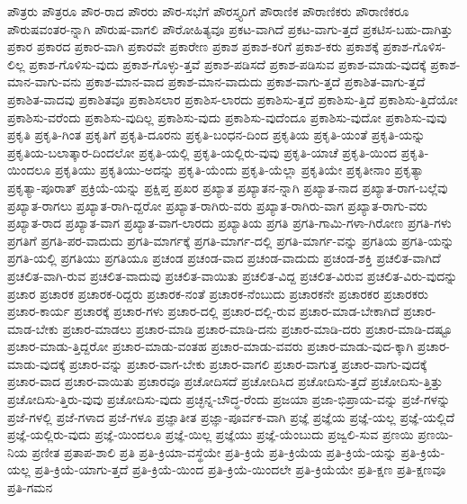 {ಪೌತ್ರರು
ಪೌತ್ರರೂ
ಪೌರ-ರಾದ
ಪೌರರು
ಪೌರ-ಸಭೆಗೆ
ಪೌರಸ್ತ್ಯರಿಗೆ
ಪೌರಾಣಿಕ
ಪೌರಾಣಿಕರು
ಪೌರಾಣಿಕರೂ
ಪೌರುಷವಂತರ-ನ್ನಾಗಿ
ಪೌರುಷ-ವಾಗಲಿ
ಪೌರೋಹಿತ್ಯವೂ
ಪ್ರಕಟ-ವಾಗಿದೆ
ಪ್ರಕಟ-ವಾಗು-ತ್ತದೆ
ಪ್ರಕಟಿಸ-ಬಹು-ದಾಗಿತ್ತು
ಪ್ರಕಾರ
ಪ್ರಕಾರದ
ಪ್ರಕಾರ-ವಾಗಿ
ಪ್ರಕಾರವೇ
ಪ್ರಕಾರೇಣ
ಪ್ರಕಾಶ
ಪ್ರಕಾಶ-ಕರಿಗೆ
ಪ್ರಕಾಶ-ಕರು
ಪ್ರಕಾಶಕ್ಕೆ
ಪ್ರಕಾಶ-ಗೊಳಿಸ-ಲಿಲ್ಲ
ಪ್ರಕಾಶ-ಗೊಳಿಸು-ವುದು
ಪ್ರಕಾಶ-ಗೊಳ್ಳು-ತ್ತವೆ
ಪ್ರಕಾಶ-ಪಡಿಸದೆ
ಪ್ರಕಾಶ-ಪಡಿಸುವ
ಪ್ರಕಾಶ-ಮಾಡು-ವುದಕ್ಕೆ
ಪ್ರಕಾಶ-ಮಾನ-ವಾಗು-ವನು
ಪ್ರಕಾಶ-ಮಾನ-ವಾದ
ಪ್ರಕಾಶ-ಮಾನ-ವಾದುದು
ಪ್ರಕಾಶ-ವಾಗು-ತ್ತದೆ
ಪ್ರಕಾಶಿತ-ವಾಗು-ತ್ತದೆ
ಪ್ರಕಾಶಿತ-ವಾದವು
ಪ್ರಕಾಶಿತವೂ
ಪ್ರಕಾಶಿಸಲಾರ
ಪ್ರಕಾಶಿಸ-ಲಾರದು
ಪ್ರಕಾಶಿಸು-ತ್ತದೆ
ಪ್ರಕಾಶಿಸು-ತ್ತಿದೆ
ಪ್ರಕಾಶಿಸು-ತ್ತಿದೆಯೋ
ಪ್ರಕಾಶಿಸು-ವರೆಂದು
ಪ್ರಕಾಶಿಸು-ವುದಿಲ್ಲ
ಪ್ರಕಾಶಿಸು-ವುದು
ಪ್ರಕಾಶಿಸು-ವುದೆಂದೂ
ಪ್ರಕಾಶಿಸು-ವುದೋ
ಪ್ರಕಾಶಿಸು-ವುವು
ಪ್ರಕೃತಿ
ಪ್ರಕೃತಿ-ಗಿಂತ
ಪ್ರಕೃತಿಗೆ
ಪ್ರಕೃತಿ-ದೂರನು
ಪ್ರಕೃತಿ-ಬಂಧನ-ದಿಂದ
ಪ್ರಕೃತಿಯ
ಪ್ರಕೃತಿ-ಯಂತೆ
ಪ್ರಕೃತಿ-ಯನ್ನು
ಪ್ರಕೃತಿಯ-ಬಲಾತ್ಕಾರ-ದಿಂದಲೋ
ಪ್ರಕೃತಿ-ಯಲ್ಲಿ
ಪ್ರಕೃತಿ-ಯಲ್ಲಿರು-ವುವು
ಪ್ರಕೃತಿ-ಯಾಚೆ
ಪ್ರಕೃತಿ-ಯಿಂದ
ಪ್ರಕೃತಿ-ಯಿಂದಲೂ
ಪ್ರಕೃತಿಯು
ಪ್ರಕೃತಿಯು-ಅದನ್ನು
ಪ್ರಕೃತಿ-ಯೆಂದು
ಪ್ರಕೃತಿ-ಯೆಲ್ಲಾ
ಪ್ರಕೃತಿಯೇ
ಪ್ರಕೃತೀನಾಂ
ಪ್ರಕೃತ್ಯಾ
ಪ್ರಕೃತ್ಯಾ-ಪೂರಾತ್
ಪ್ರಕ್ರಿಯೆ-ಯನ್ನು
ಪ್ರಕ್ಷಿಪ್ತ
ಪ್ರಖರ
ಪ್ರಖ್ಯಾತ
ಪ್ರಖ್ಯಾತನ-ನ್ನಾಗಿ
ಪ್ರಖ್ಯಾತ-ನಾದ
ಪ್ರಖ್ಯಾತ-ರಾಗ-ಬಲ್ಲೆವು
ಪ್ರಖ್ಯಾತ-ರಾಗಲು
ಪ್ರಖ್ಯಾತ-ರಾಗಿ-ದ್ದರೋ
ಪ್ರಖ್ಯಾತ-ರಾಗಿರು-ವರು
ಪ್ರಖ್ಯಾತ-ರಾಗಿರು-ವಾಗ
ಪ್ರಖ್ಯಾತ-ರಾಗು-ವರು
ಪ್ರಖ್ಯಾತ-ರಾದ
ಪ್ರಖ್ಯಾತ-ವಾಗ
ಪ್ರಖ್ಯಾತ-ವಾಗ-ಲಾರದು
ಪ್ರಖ್ಯಾತಿಯ
ಪ್ರಗತಿ
ಪ್ರಗತಿ-ಗಾಮಿ-ಗಳಾ-ಗಿರೋಣ
ಪ್ರಗತಿ-ಗಳು
ಪ್ರಗತಿಗೆ
ಪ್ರಗತಿ-ಪರ-ವಾದುದು
ಪ್ರಗತಿ-ಮಾರ್ಗಕ್ಕೆ
ಪ್ರಗತಿ-ಮಾರ್ಗ-ದಲ್ಲಿ
ಪ್ರಗತಿ-ಮಾರ್ಗ-ವನ್ನು
ಪ್ರಗತಿಯ
ಪ್ರಗತಿ-ಯನ್ನು
ಪ್ರಗತಿ-ಯಲ್ಲಿ
ಪ್ರಗತಿಯು
ಪ್ರಗತಿಯೂ
ಪ್ರಚಂಡ
ಪ್ರಚಂಡ-ವಾದ
ಪ್ರಚಂಡ-ವಾದುದು
ಪ್ರಚಂಡ-ಶಕ್ತಿ
ಪ್ರಚಲಿತ-ವಾಗಿದೆ
ಪ್ರಚಲಿತ-ವಾಗಿ-ರುವ
ಪ್ರಚಲಿತ-ವಾದುವು
ಪ್ರಚಲಿತ-ವಾಯಿತು
ಪ್ರಚಲಿತ-ವಿದ್ದ
ಪ್ರಚಲಿತ-ವಿರುವ
ಪ್ರಚಲಿತ-ವಿರು-ವುದನ್ನು
ಪ್ರಚಾರ
ಪ್ರಚಾರಕ
ಪ್ರಚಾರಕ-ರಿದ್ದರು
ಪ್ರಚಾರಕ-ನಂತೆ
ಪ್ರಚಾರಕ-ನೆಂಬುದು
ಪ್ರಚಾರಕನೇ
ಪ್ರಚಾರಕರ
ಪ್ರಚಾರಕರು
ಪ್ರಚಾರ-ಕಾರ್ಯ
ಪ್ರಚಾರಕ್ಕೆ
ಪ್ರಚಾರ-ಗಳು
ಪ್ರಚಾರ-ದಲ್ಲಿ
ಪ್ರಚಾರ-ದಲ್ಲಿ-ರುವ
ಪ್ರಚಾರ-ಮಾಡ-ಬೇಕಾಗಿದೆ
ಪ್ರಚಾರ-ಮಾಡ-ಬೇಕು
ಪ್ರಚಾರ-ಮಾಡಲು
ಪ್ರಚಾರ-ಮಾಡಿ
ಪ್ರಚಾರ-ಮಾಡಿ-ದನು
ಪ್ರಚಾರ-ಮಾಡಿ-ದರು
ಪ್ರಚಾರ-ಮಾಡಿ-ದಷ್ಟೂ
ಪ್ರಚಾರ-ಮಾಡು-ತ್ತಿದ್ದರೋ
ಪ್ರಚಾರ-ಮಾಡು-ವಂತಹ
ಪ್ರಚಾರ-ಮಾಡು-ವವರು
ಪ್ರಚಾರ-ಮಾಡು-ವುದ-ಕ್ಕಾಗಿ
ಪ್ರಚಾರ-ಮಾಡು-ವುದಕ್ಕೆ
ಪ್ರಚಾರ-ವನ್ನು
ಪ್ರಚಾರ-ವಾಗ-ಬೇಕು
ಪ್ರಚಾರ-ವಾಗಲಿ
ಪ್ರಚಾರ-ವಾಗುತ್ತ
ಪ್ರಚಾರ-ವಾಗು-ವುದಕ್ಕೆ
ಪ್ರಚಾರ-ವಾದ
ಪ್ರಚಾರ-ವಾಯಿತು
ಪ್ರಚಾರವೂ
ಪ್ರಚೋದಿಸದೆ
ಪ್ರಚೋದಿಸಿದ
ಪ್ರಚೋದಿಸು-ತ್ತದೆ
ಪ್ರಚೋದಿಸು-ತ್ತಿತ್ತು
ಪ್ರಚೋದಿಸು-ತ್ತಿರು-ವುವು
ಪ್ರಚೋದಿಸು-ವುದು
ಪ್ರಚ್ಛನ್ನ-ಬೌದ್ಧ-ರೆಂದು
ಪ್ರಜಯಾ
ಪ್ರಜಾ-ಭಿಪ್ರಾಯ-ವನ್ನು
ಪ್ರಜೆ-ಗಳನ್ನು
ಪ್ರಜೆ-ಗಳಲ್ಲಿ
ಪ್ರಜೆ-ಗಳಾದ
ಪ್ರಜೆ-ಗಳೂ
ಪ್ರಜ್ಞಾತೀತ
ಪ್ರಜ್ಞಾ-ಪೂರ್ವಕ-ವಾಗಿ
ಪ್ರಜ್ಞೆ
ಪ್ರಜ್ಞೆಯ
ಪ್ರಜ್ಞೆ-ಯಲ್ಲ
ಪ್ರಜ್ಞೆ-ಯಲ್ಲಿದೆ
ಪ್ರಜ್ಞೆ-ಯಲ್ಲಿರು-ವುದು
ಪ್ರಜ್ಞೆ-ಯಿಂದಲೂ
ಪ್ರಜ್ಞೆ-ಯಿಲ್ಲ
ಪ್ರಜ್ಞೆಯು
ಪ್ರಜ್ಞೆ-ಯೆಂಬುದು
ಪ್ರಜ್ವಲಿ-ಸುವ
ಪ್ರಣಯಿ
ಪ್ರಣಯಿ-ನಿಯ
ಪ್ರಣೀತ
ಪ್ರತಾಪ-ಶಾಲಿ
ಪ್ರತಿ
ಪ್ರತಿ-ಕ್ರಿಯಾ-ವಸ್ಥೆಯೇ
ಪ್ರತಿ-ಕ್ರಿಯೆ
ಪ್ರತಿ-ಕ್ರಿಯೆಯ
ಪ್ರತಿ-ಕ್ರಿಯೆ-ಯನ್ನು
ಪ್ರತಿ-ಕ್ರಿಯೆ-ಯಲ್ಲ
ಪ್ರತಿ-ಕ್ರಿಯೆ-ಯಾಗು-ತ್ತದೆ
ಪ್ರತಿ-ಕ್ರಿಯೆ-ಯಿಂದ
ಪ್ರತಿ-ಕ್ರಿಯೆ-ಯಿಂದಲೇ
ಪ್ರತಿ-ಕ್ರಿಯೆಯೇ
ಪ್ರತಿ-ಕ್ಷಣ
ಪ್ರತಿ-ಕ್ಷಣವೂ
ಪ್ರತಿ-ಗಮನ
}
